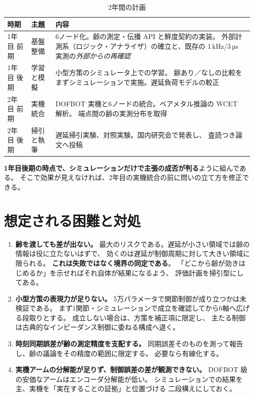 \documentclass[11pt,a4paper]{article}
\newcommand{\prob}[1]{\textbf{\textcolor{red!55!black}{#1}}}
\newcommand{\keyp}[1]{\textbf{\textcolor{blue!45!black}{#1}}}
\begin{document}
\begin{table}[htbp]
\centering
\small
\caption{2年間の計画}
\begin{tabularx}{\textwidth}{@{}l l X@{}}
\toprule
\textbf{時期} & \textbf{主題} & \textbf{内容} \\
\midrule
1年目 前期 & 基盤整備 & 6ノード化。齢の測定・伝播 API と鮮度契約の実装。
  外部計測系（ロジック・アナライザ）の確立と、既存の 1\,kHz/3\,µs 実測の\emph{外部からの再確認} \\
1年目 後期 & 学習と模擬 & 小型方策のシミュレータ上での学習。
  齢あり／なしの比較をまずシミュレーションで実施。遅延負荷モデルの較正 \\
2年目 前期 & 実機統合 & DOFBOT 実機と6ノードの統合。ベアメタル推論の WCET 解析。
  端点間の齢の実測分布を取得 \\
2年目 後期 & 掃引と執筆 & 遅延掃引実験、対照実験。国内研究会で発表し、
  査読つき論文へ投稿 \\
\bottomrule
\end{tabularx}
\end{table}

\noindent
\keyp{1年目後期の時点で、シミュレーションだけで主張の成否が判る}ように組んである。
そこで効果が見えなければ、2年目の実機統合の前に問いの立て方を修正できる。

\section{想定される困難と対処}

\begin{enumerate}[leftmargin=1.6em,itemsep=4pt]
  \item \prob{齢を渡しても差が出ない。}
        最大のリスクである。遅延が小さい領域では齢の情報は役に立たないはずで、
        効くのは遅延が制御周期に対して大きい領域に限られる。
        \keyp{これは失敗ではなく境界の同定である}。
        「どこから齢が効きはじめるか」を示せればそれ自体が結果になるよう、
        評価計画を掃引型にしてある。
  \item \prob{小型方策の表現力が足りない。}
        5万パラメータで関節制御が成り立つかは未検証である。
        まず1関節・シミュレーションで成立を確認してから6軸へ広げる段取りとする。
        成立しない場合は、方策を補正項に限定し、
        主たる制御は古典的なインピーダンス制御に委ねる構成へ退く。
  \item \prob{時刻同期誤差が齢の測定精度を支配する。}
        同期誤差そのものを測って報告し、齢の議論をその精度の範囲に限定する。
        必要なら有線化する。
  \item \prob{実機アームの分解能が足りず、制御誤差の差が観測できない。}
        DOFBOT 級の安価なアームはエンコーダ分解能が低い。
        シミュレーションでの結果を主、実機を「実在することの証拠」と位置づける
        二段構えにしておく。
\end{enumerate}
\end{document}
